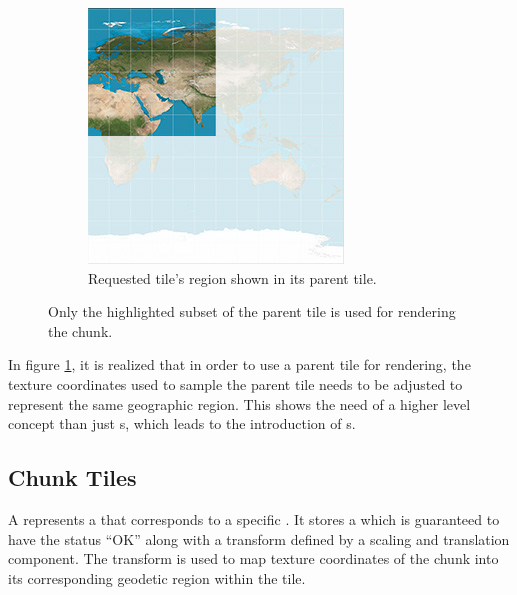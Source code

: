 \begin{figure}[htbp]
\begin{subfigure}[t]{0.3\textwidth}
        \includegraphics[width=\textwidth]{figures/implementation/chunktile/chunktile2.jpg}
        \caption{Requested tile's region shown in its parent tile.}
    \end{subfigure}
    \caption{Only the highlighted subset of the parent tile is used for rendering the chunk.}
    \label{fig:tiles}
\end{figure}

In figure \ref{fig:tiles}, it is realized that in order to use a parent tile for rendering, the texture coordinates used to sample the parent tile needs to be adjusted to represent the same geographic region. This shows the need of a higher level concept than just s, which leads to the introduction of s.

\subsection{Chunk Tiles}
  
A  represents a  that corresponds to a specific . It stores a  which is guaranteed to have the status ``OK'' along with a transform defined by a scaling and translation component. The transform is used to map texture coordinates of the chunk into its corresponding geodetic region within the tile. 

